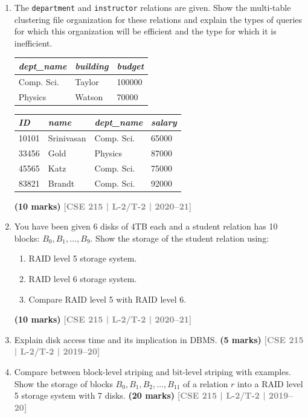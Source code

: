 \documentclass[12pt]{article}
\newcommand{\yr}[1]{\hfill\textcolor{gray}{\small\textbf{[#1]}}}
\newcommand{\mk}[1]{\textcolor{orange!70!black}{\small\textbf{(#1 marks)}}}
\begin{document}
\begin{enumerate}
\item The \texttt{department} and \texttt{instructor} relations are given. Show the multi-table clustering file organization for these relations and explain the types of queries for which this organization will be efficient and the type for which it is inefficient.
\begin{center}
    \begin{tabular}{|l|l|l|}
        \hline
        \textit{dept\_name} & \textit{building} & \textit{budget} \\
        \hline \hline
        Comp. Sci. & Taylor & 100000 \\
        Physics & Watson & 70000 \\
        \hline
    \end{tabular}
    \hspace{1cm} %
    \begin{tabular}{|l|l|l|l|}
        \hline
        \textit{ID} & \textit{name} & \textit{dept\_name} & \textit{salary} \\
        \hline \hline
        10101 & Srinivasan & Comp. Sci. & 65000 \\
        33456 & Gold & Physics & 87000 \\
        45565 & Katz & Comp. Sci. & 75000 \\
        83821 & Brandt & Comp. Sci. & 92000 \\
        \hline
    \end{tabular}
\end{center}
\mk{10} \yr{CSE 215 | L-2/T-2 | 2020--21}


\item You have been given 6 disks of 4TB each and a student relation has 10 blocks: $B_0, B_1, \ldots, B_9$. Show the storage of the student relation using:
\begin{enumerate}
  \item RAID level 5 storage system.
  \item RAID level 6 storage system.
  \item Compare RAID level 5 with RAID level 6.
\end{enumerate}
\mk{10} \yr{CSE 215 | L-2/T-2 | 2020--21}


\item Explain disk access time and its implication in DBMS.
\mk{5} \yr{CSE 215 | L-2/T-2 | 2019--20}


\item Compare between block-level striping and bit-level striping with examples. Show the storage of blocks $B_0, B_1, B_2, \ldots, B_{11}$ of a relation $r$ into a RAID level 5 storage system with 7 disks.
\mk{20} \yr{CSE 215 | L-2/T-2 | 2019--20}



\end{enumerate}
\end{document}
